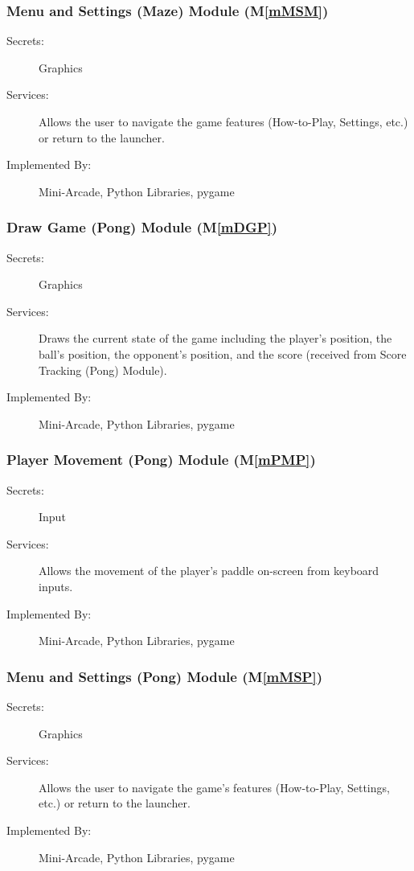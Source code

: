 \documentclass[12pt, titlepage]{article}
\newcommand{\mref}[1]{M\ref{#1}}
\begin{document}
\subsubsection{Menu and Settings (Maze) Module (\mref{mMSM})}
\begin{description}
\item[Secrets:] Graphics
\item[Services:] Allows the user to navigate the game features (How-to-Play, Settings, etc.) or return to the launcher.
\item[Implemented By:] Mini-Arcade, Python Libraries, pygame
\end{description}

\subsubsection{Draw Game (Pong) Module (\mref{mDGP})}
\begin{description}
\item[Secrets:] Graphics
\item[Services:] Draws the current state of the game including the player's position, the ball's position, the opponent's position, and the score (received from Score Tracking (Pong) Module).
\item[Implemented By:] Mini-Arcade, Python Libraries, pygame
\end{description}

\subsubsection{Player Movement (Pong) Module (\mref{mPMP})}
\begin{description}
\item[Secrets:] Input
\item[Services:] Allows the movement of the player's paddle on-screen from keyboard inputs.
\item[Implemented By:] Mini-Arcade, Python Libraries, pygame
\end{description}

\subsubsection{Menu and Settings (Pong) Module (\mref{mMSP})}
\begin{description}
\item[Secrets:] Graphics
\item[Services:] Allows the user to navigate the game's features (How-to-Play, Settings, etc.) or return to the launcher.
\item[Implemented By:] Mini-Arcade, Python Libraries, pygame
\end{description}
\end{document}
